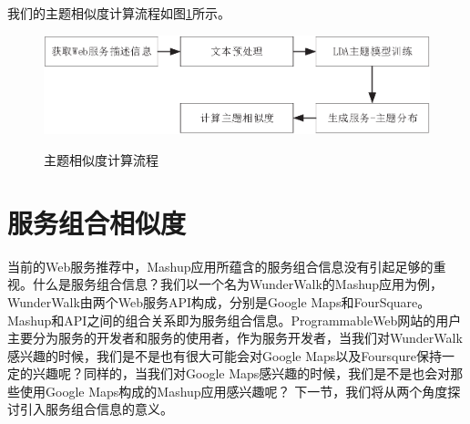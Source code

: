\documentclass[master,winfonts]{njuthesis}
\begin{document}
我们的主题相似度计算流程如图\ref{fig:3-13}所示。
\begin{figure}[htbp]
  \centering
  \includegraphics[width=\textwidth]{LDA_kuangjia.eps}\\
  \caption{主题相似度计算流程}\label{fig:3-13}
\end{figure}

\section{服务组合相似度}
当前的Web服务推荐中，Mashup应用所蕴含的服务组合信息没有引起足够的重视。什么是服务组合信息？我们以一个名为WunderWalk的Mashup应用为例，WunderWalk由两个Web服务API构成，分别是Google Maps和FourSquare。Mashup和API之间的组合关系即为服务组合信息。ProgrammableWeb网站的用户主要分为服务的开发者和服务的使用者，作为服务开发者，当我们对WunderWalk感兴趣的时候，我们是不是也有很大可能会对Google Maps以及Foursqure保持一定的兴趣呢？同样的，当我们对Google Maps感兴趣的时候，我们是不是也会对那些使用Google Maps构成的Mashup应用感兴趣呢？
下一节，我们将从两个角度探讨引入服务组合信息的意义。
\end{document}
